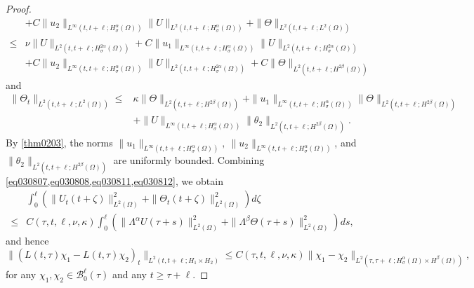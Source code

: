 \documentclass[oneside,preprint,12pt,numbers,sort&compress]{elsarticle}
\begin{document}
\begin{proof}
\begin{equation}
\begin{aligned}
&+ C
\| u_2 \|_{L^{\infty}(t,t+\ell;H_\sigma^{\alpha}(\Omega))}
\| U \|_{L^{2}(t,t+\ell;H_\sigma^{\alpha}(\Omega))}
+ \| \Theta \|_{L^{2}(t,t+\ell;L^{2}(\Omega))} 
\\ 
\leq
& \nu \| U \|_{L^{2}(t,t+\ell;H_\sigma^{2\alpha}(\Omega))}
+ C\| u_1 \|_{L^{\infty}(t,t+\ell;H_\sigma^{\alpha}(\Omega))}
\| U \|_{L^{2}(t,t+\ell;H_\sigma^{2\alpha}(\Omega))} \\
&+ C
\| u_2 \|_{L^{\infty}(t,t+\ell;H_\sigma^{\alpha}(\Omega))}
\| U \|_{L^{2}(t,t+\ell;H_\sigma^{2\alpha}(\Omega))}
+ C \| \Theta \|_{L^{2}(t,t+\ell;H^{2\beta}(\Omega))} 
\end{aligned}
\end{equation}
and
\begin{equation}\label{eq030812}
\begin{aligned}
\| \Theta_t \|_{L^{2}(t,t+\ell;L^{2}(\Omega))} 
\leq
& \kappa \| \Theta  \|_{L^{2}(t,t+\ell;H^{2\beta}(\Omega))}
+ 
\| u_1 \|_{L^{\infty}(t,t+\ell;H_\sigma^{\alpha}(\Omega))}
\| \Theta  \|_{L^{2}(t,t+\ell;H^{2\beta}(\Omega))} \\
&
+ \|U \|_{L^{\infty}(t,t+\ell;H_\sigma^{\alpha}(\Omega))}
\| \theta_2 \|_{L^{2}(t,t+\ell;H^{2\beta}(\Omega))}.
\end{aligned}
\end{equation}
By \cref{thm0203}, the norms $\| u_1 \|_{L^{\infty}(t,t+\ell;H_\sigma^{\alpha}(\Omega))},\ \| u_2 \|_{L^{\infty}(t,t+\ell;H_\sigma^{\alpha}(\Omega))}$, and $\| \theta_2 \|_{L^{2}(t,t+\ell;H^{2\beta}(\Omega))}$ are uniformly bounded. Combining \cref{eq030807,eq030808,eq030811,eq030812}, we obtain 
\begin{equation}\label{eq030813}
\begin{aligned}
&
\int_{0}^{\ell} 
\left( \| U_{t}(t+\zeta) \|_{L^2(\Omega)}^{2} + \| \Theta_{t}(t+\zeta) \|_{L^2(\Omega)}^{2}  \right) d\zeta
\\
\leq
& C(\tau,t,\ell,\nu,\kappa)
\int_{0}^{\ell}
\left( \| \Lambda^{\alpha}U(\tau+s) \|_{L^2(\Omega)}^{2} 
+ \| \Lambda^{\beta}\Theta (\tau+s) \|_{L^2(\Omega)}^{2} \right) ds,
\end{aligned}
\end{equation}
and hence
$$
\|\left( L(t, \tau)\chi_1 - L(t, \tau)\chi_2  \right)_{t}\|_{L^2(t, t+\ell; H_{1}\times H_{2})}
\leq C(\tau,t,\ell,\nu,\kappa) \| \chi_1 - \chi_2 \|_{L^2(\tau, \tau+\ell; H_\sigma^{\alpha}(\Omega) \times H^{\beta}(\Omega))},
$$
for any $\chi_1, \chi_2 \in \mathcal{B}_0^\ell(\tau)$ and any $t \geq \tau + \ell$.
\end{proof}
\end{document}
